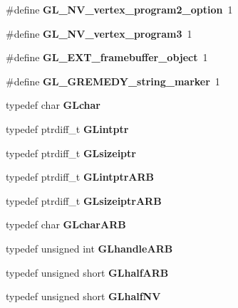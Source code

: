 \begin{DoxyCompactItemize}
\item 
\#define {\bfseries G\+L\+\_\+\+N\+V\+\_\+vertex\+\_\+program2\+\_\+option}~1\label{_s_d_l__opengl_8h_adef06c945d7d7fded2f43306bbd785d0}

\item 
\#define {\bfseries G\+L\+\_\+\+N\+V\+\_\+vertex\+\_\+program3}~1\label{_s_d_l__opengl_8h_aa10c916c3dffae48d6eb2d0da510d5e1}

\item 
\#define {\bfseries G\+L\+\_\+\+E\+X\+T\+\_\+framebuffer\+\_\+object}~1\label{_s_d_l__opengl_8h_a8cfbfba877bf7f1760de1c15ef6cc682}

\item 
\#define {\bfseries G\+L\+\_\+\+G\+R\+E\+M\+E\+D\+Y\+\_\+string\+\_\+marker}~1\label{_s_d_l__opengl_8h_acd9fae209efa623a7868244c1f1cb43f}

\item 
typedef char {\bfseries G\+Lchar}\label{_s_d_l__opengl_8h_af7575655ac056b187ea385966b95a22d}

\item 
typedef ptrdiff\+\_\+t {\bfseries G\+Lintptr}\label{_s_d_l__opengl_8h_a0374caf1f25a139da21f84d81f637c23}

\item 
typedef ptrdiff\+\_\+t {\bfseries G\+Lsizeiptr}\label{_s_d_l__opengl_8h_aa4edc01036f13fcf17e0b1baf6c70ea7}

\item 
typedef ptrdiff\+\_\+t {\bfseries G\+Lintptr\+A\+R\+B}\label{_s_d_l__opengl_8h_a5077b8a49fe00b9e912f4e0587697fc7}

\item 
typedef ptrdiff\+\_\+t {\bfseries G\+Lsizeiptr\+A\+R\+B}\label{_s_d_l__opengl_8h_a229b8be5cc4beaa309119690e9ec4033}

\item 
typedef char {\bfseries G\+Lchar\+A\+R\+B}\label{_s_d_l__opengl_8h_ac2f31b59b9462b23a2631eb005e07b51}

\item 
typedef unsigned int {\bfseries G\+Lhandle\+A\+R\+B}\label{_s_d_l__opengl_8h_a97b4493b005afc03858a4a45e2fc4128}

\item 
typedef unsigned short {\bfseries G\+Lhalf\+A\+R\+B}\label{_s_d_l__opengl_8h_ad59bbe9a8295f324087b6a3bd454bac4}

\item 
typedef unsigned short {\bfseries G\+Lhalf\+N\+V}\label{_s_d_l__opengl_8h_a31e7c1ab4b4de65e6e375457b9d9e905}


\end{DoxyCompactItemize}

